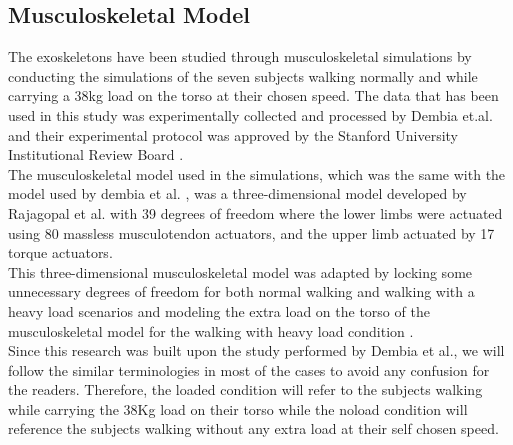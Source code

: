 \documentclass[10pt,letterpaper]{article}
\begin{document}
\subsection*{Musculoskeletal Model}
The exoskeletons have been studied through musculoskeletal simulations by conducting the simulations of the seven subjects walking normally and while carrying a 38kg load on the torso at their chosen speed. The data that has been used in this study was experimentally collected and processed by Dembia et.al. \cite{93} and their experimental protocol was approved by the Stanford University Institutional Review Board \cite{93}.\\
The musculoskeletal model used in the simulations, which was the same with the model used by dembia et al. \cite{93}, was a three-dimensional model developed by Rajagopal et al. \cite{130} with 39 degrees of freedom where the lower limbs were actuated using 80 massless musculotendon actuators, and the upper limb actuated by 17 torque actuators\cite{130}. \\
This three-dimensional musculoskeletal model was adapted by locking some unnecessary degrees of freedom for both normal walking and walking with a heavy load scenarios and modeling the extra load on the torso of the musculoskeletal model for the walking with heavy load condition \cite{93}.\\
Since this research was built upon the study performed by Dembia et al., we will follow the similar terminologies in most of the cases to avoid any confusion for the readers. Therefore, the loaded condition will refer to the subjects walking while carrying the 38Kg load on their torso while the noload condition will reference the subjects walking without any extra load at their self chosen speed.
\end{document}
